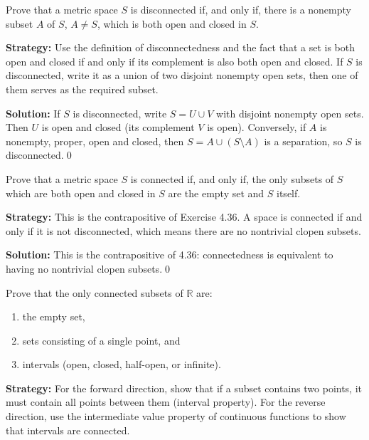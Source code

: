\begin{problembox}
Prove that a metric space $S$ is disconnected if, and only if, there is a nonempty subset $A$ of $S$, $A \neq S$, which is both open and closed in $S$.
\end{problembox}

\noindent\textbf{Strategy:} Use the definition of disconnectedness and the fact that a set is both open and closed if and only if its complement is also both open and closed. If $S$ is disconnected, write it as a union of two disjoint nonempty open sets, then one of them serves as the required subset.

\bigskip\noindent\textbf{Solution:}
If $S$ is disconnected, write $S=U\cup V$ with disjoint nonempty open sets. Then $U$ is open and closed (its complement $V$ is open). Conversely, if $A$ is nonempty, proper, open and closed, then $S=A\cup(S\setminus A)$ is a separation, so $S$ is disconnected.\qed



\begin{problembox}
Prove that a metric space $S$ is connected if, and only if, the only subsets of $S$ which are both open and closed in $S$ are the empty set and $S$ itself.
\end{problembox}

\noindent\textbf{Strategy:} This is the contrapositive of Exercise 4.36. A space is connected if and only if it is not disconnected, which means there are no nontrivial clopen subsets.

\bigskip\noindent\textbf{Solution:}
This is the contrapositive of 4.36: connectedness is equivalent to having no nontrivial clopen subsets.\qed



\begin{problembox}
Prove that the only connected subsets of $\mathbb{R}$ are:
\begin{enumerate}[label=(\alph*)]
\item the empty set,
\item sets consisting of a single point, and
\item intervals (open, closed, half-open, or infinite).
\end{enumerate}
\end{problembox}

\noindent\textbf{Strategy:} For the forward direction, show that if a subset contains two points, it must contain all points between them (interval property). For the reverse direction, use the intermediate value property of continuous functions to show that intervals are connected.

